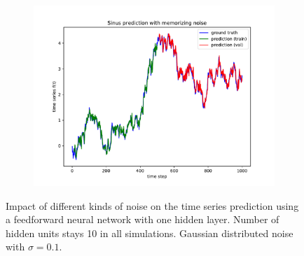 \documentclass{article}
\begin{document}
\begin{figure}
\begin{subfigure}{.35\textwidth}
  \end{subfigure} 
  \hspace{-5mm}
  \begin{subfigure}{.35\textwidth}
    \centering
    \includegraphics[width=\linewidth]{figures/plot_twolayer_memnoise.pdf}
  \end{subfigure}
  \caption{Impact of different kinds of noise on the time series prediction
  using a feedforward neural network with one hidden layer. Number of hidden
  units stays 10 in all simulations. Gaussian distributed noise with $\sigma = 
  0.1$.}
  \label{fig:noise_impact} 
\end{figure}
\end{document}
